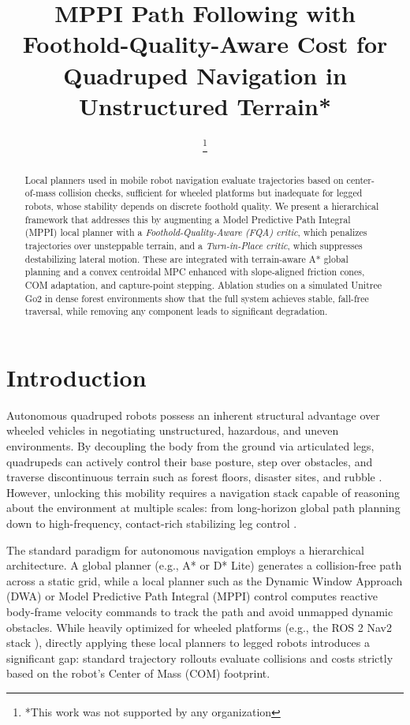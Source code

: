 \documentclass[letterpaper, 10 pt, conference]{ieeeconf}  %
\title{\LARGE \bf
 MPPI Path Following with Foothold-Quality-Aware Cost for Quadruped Navigation in Unstructured Terrain*
}
\author{
\thanks{*This work was not supported by any organization}%
}
\begin{document}
\maketitle
\thispagestyle{empty}
\pagestyle{empty}


\begin{abstract}
Local planners used in mobile robot navigation evaluate trajectories based on center-of-mass collision checks, sufficient for wheeled platforms but inadequate for legged robots, whose stability depends on discrete foothold quality. We present a hierarchical framework that addresses this by augmenting a Model Predictive Path Integral (MPPI) local planner with a \textit{Foothold-Quality-Aware (FQA) critic}, which penalizes trajectories over unsteppable terrain, and a \textit{Turn-in-Place critic}, which suppresses destabilizing lateral motion. These are integrated with terrain-aware A* global planning and a convex centroidal MPC enhanced with slope-aligned friction cones, COM adaptation, and capture-point stepping. Ablation studies on a simulated Unitree Go2 in dense forest environments show that the full system achieves stable, fall-free traversal, while removing any component leads to significant degradation.
\end{abstract}



\section{Introduction}

Autonomous quadruped robots possess an inherent structural advantage over wheeled vehicles in negotiating unstructured, hazardous, and uneven environments. By decoupling the body from the ground via articulated legs, quadrupeds can actively control their base posture, step over obstacles, and traverse discontinuous terrain such as forest floors, disaster sites, and rubble \cite{Hutter2016ANYmal, Bledt2018MITCheetah3}. However, unlocking this mobility requires a navigation stack capable of reasoning about the environment at multiple scales: from long-horizon global path planning down to high-frequency, contact-rich stabilizing leg control \cite{Fankhauser2018Robust}. 

The standard paradigm for autonomous navigation employs a hierarchical architecture. A global planner (e.g., A* or D* Lite) generates a collision-free path across a static grid, while a local planner such as the Dynamic Window Approach (DWA) or Model Predictive Path Integral (MPPI) control \cite{Williams2016Aggressive, Williams2016MPPI} computes reactive body-frame velocity commands to track the path and avoid unmapped dynamic obstacles. While heavily optimized for wheeled platforms (e.g., the ROS 2 Nav2 stack \cite{Macenski2023Nav2}), directly applying these local planners to legged robots introduces a significant gap: standard trajectory rollouts evaluate collisions and costs strictly based on the robot's Center of Mass (COM) footprint. 
\end{document}
